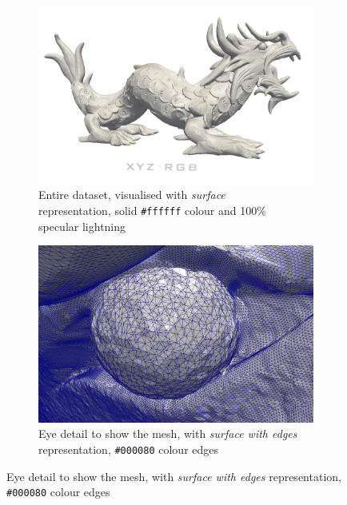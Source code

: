 \documentclass[openany]{article}
\begin{document}
\begin{figure}[h]
\centering
\begin{subfigure}{.5\textwidth}
  \centering
  \includegraphics[width=\linewidth]{Asian_Dragon/asian_dragon}
  \caption{Entire dataset, visualised with \textit{surface}  \\
  representation, solid \texttt{\#ffffff} colour and 100\% \\ specular lightning}
\end{subfigure}%
\begin{subfigure}{.5\textwidth}
  \centering
  \includegraphics[width=\linewidth]{Asian_Dragon/eye_detail_edges}
  \caption{Eye detail to show the mesh, with \textit{surface with edges} representation, \texttt{\#000080} colour edges}
\end{subfigure}
\end{figure}
\end{document}
